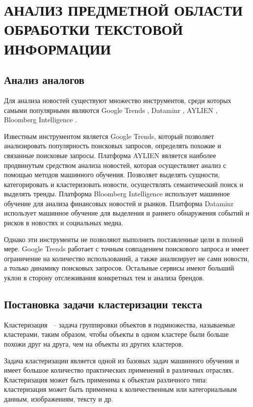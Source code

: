 \chapter{АНАЛИЗ ПРЕДМЕТНОЙ ОБЛАСТИ ОБРАБОТКИ ТЕКСТОВОЙ ИНФОРМАЦИИ}
\label{chap:analysis}
\aftertitle

\section{Анализ аналогов}

Для анализа новостей существуют множество инструментов, среди которых самыми популярными являются Google Trends \cite{google-trends}, Dataminr \cite{dataminr}, AYLIEN \cite{aylien}, Bloomberg Intelligence \cite{bloomberg}.

Известным инструментом является Google Trends, который позволяет анализировать
популярность поисковых запросов, определять похожие и связанные поисковые запросы.
Платформа AYLIEN является наиболее продвинутым средством анализа новостей, которая
осуществляет анализ с помощью методов машинного обучения. Позволяет выделять
сущности, категорировать и кластеризовать новости, осуществлять семантический поиск и
выделять тренды.
Платформа Bloomberg Intelligence использует машинное обучение для анализа финансовых
новостей и рынков.
Платформа Dataminr использует машинное обучение для выделения и раннего обнаружения
событий и рисков в новостях и социальных медиа.

Однако эти инструменты не позволяют выполнить поставленные цели в полной мере. Google Trends работает с точным совпадением поискового запроса и имеет ограничение на количество использований, а также анализирует не сами новости, а только динамику поисковых запросов. Остальные сервисы имеют больший уклон в сторону отслеживания конкретных тем и анализа брендов.


\section{Постановка задачи кластеризации текста}

Кластеризация ~-- задача группировки объектов в подмножества, называемые кластерами, таким образом, чтобы объекты в одном кластере были больше похожи друг на друга, чем на объекты из других кластеров.

Задача кластеризации является одной из базовых задач машинного обучения и имеет большое количество практических применений в различных отраслях. Кластеризация может быть применима к объектам различного типа: кластеризация может быть применена к количественным или категориальным данным, изображениям, тексту и др.

